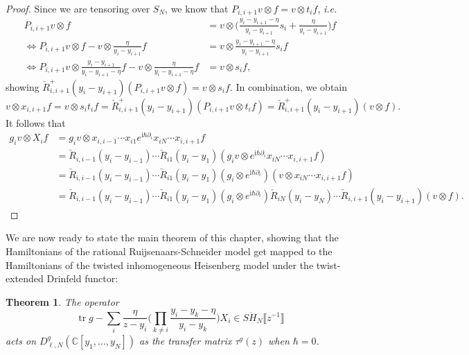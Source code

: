 \documentclass[11pt]{report}
\newtheorem{theorem}{Theorem}[section]
\theoremstyle{definition}
\theoremstyle{remark}
\theoremstyle{remark}
\newcommand{\C}{\mathbb{C}}
\newcommand{\I}{\mathrm{i}}
\begin{document}
\begin{proof}
Since we are tensoring over $S_N$, we know that $P_{i,i+1} v \otimes f = v \otimes t_i f$, \emph{i.e.}
\begin{align*}
P_{i,i+1} v \otimes f &= v \otimes \bigg( \frac{y_i-y_{i+1}-\eta}{y_i-y_{i+1}} s_i + \frac{\eta}{y_i-y_{i+1}} \bigg) f \\
\Leftrightarrow P_{i,i+1} v \otimes f - v \otimes \frac{\eta}{y_i-y_{i+1}} f &= v \otimes \frac{y_i-y_{i+1}-\eta}{y_i-y_{i+1}} s_i f \\
\Leftrightarrow P_{i,i+1} v \otimes \frac{y_i-y_{i+1}}{y_i-y_{i+1}-\eta} f - v \otimes \frac{\eta}{y_i-y_{i+1}-\eta} f &= v \otimes s_i f,
\end{align*}
showing $\check R_{i,i+1}^+(y_i-y_{i+1}) (P_{i,i+1} v \otimes f) = v \otimes s_i f$. In combination, we obtain
\begin{equation*}
v \otimes x_{i,i+1} f = v \otimes s_i t_i f = \check R_{i,i+1}^+(y_i-y_{i+1}) (P_{i,i+1} v \otimes t_i f) = \check R_{i,i+1}^+(y_i-y_{i+1})(v \otimes f).
\end{equation*}
It follows that
\begin{align*}
g_i v \otimes X_i f
&= g_i v \otimes x_{i,i-1} \cdots x_{i1} e^{\I \hbar \partial_i} x_{iN} \cdots x_{i,i+1} f \\
&= \check R_{i,i-1}(y_i-y_{i-1}) \cdots \check R_{i1}(y_i-y_1) (g_i v \otimes e^{\I \hbar \partial_i} x_{iN} \cdots x_{i,i+1} f) \\
&= \check R_{i,i-1}(y_i-y_{i-1}) \cdots \check R_{i1}(y_i-y_1) (g_i \otimes e^{\I \hbar \partial_i}) (v \otimes x_{iN} \cdots x_{i,i+1} f) \\
&= \check R_{i,i-1}(y_i-y_{i-1}) \cdots \check R_{i1}(y_i-y_1) (g_i \otimes e^{\I \hbar \partial_i}) \check R_{iN}(y_i-y_N) \cdots \check R_{i,i+1}(y_i-y_{i+1}) (v \otimes f).
\end{align*}
\end{proof}

We are now ready to state the main theorem of this chapter, showing that the Hamiltonians of the rational Ruijsenaars-Schneider model get mapped to the Hamiltonians of the twisted inhomogeneous Heisenberg model under the twist-extended Drinfeld functor:

\begin{theorem}
The operator
\begin{equation*}
\operatorname{tr} g - \sum_i \frac{\eta}{z-y_i} \bigg( \prod_{k \neq i} \frac{y_i-y_k-\eta}{y_i-y_k} \bigg) X_i \in S\ddot H_N\llbracket z^{-1} \rrbracket
\end{equation*}
acts on $D_{\ell,N}^g(\C[y_1,...,y_N])$ as the transfer matrix $\tau^g(z)$ when $\hbar = 0$.
\end{theorem}
\end{document}
